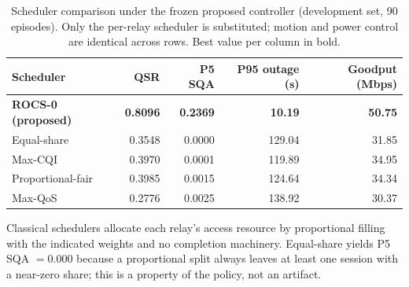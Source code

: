 \begin{table}[t]
\centering
\caption{Scheduler comparison under the frozen proposed controller (development set, 90 episodes). Only the per-relay scheduler is substituted; motion and power control are identical across rows. Best value per column in bold.}
\label{tab:sched}
\begin{tabular}{@{}lrrrr@{}}
\toprule
Scheduler & QSR & P5 SQA & P95 outage (s) & Goodput (Mbps) \\
\midrule
\textbf{ROCS-0 (proposed)} & \textbf{0.8096} & \textbf{0.2369} & \textbf{10.19} & \textbf{50.75} \\
Equal-share & 0.3548 & 0.0000 & 129.04 & 31.85 \\
Max-CQI & 0.3970 & 0.0001 & 119.89 & 34.95 \\
Proportional-fair & 0.3985 & 0.0015 & 124.64 & 34.34 \\
Max-QoS & 0.2776 & 0.0025 & 138.92 & 30.37 \\
\bottomrule
\end{tabular}
\begin{flushleft}\footnotesize
Classical schedulers allocate each relay's access resource by proportional filling with the indicated weights and no completion machinery. Equal-share yields P5 SQA $=0.000$ because a proportional split always leaves at least one session with a near-zero share; this is a property of the policy, not an artifact.
\end{flushleft}
\end{table}
